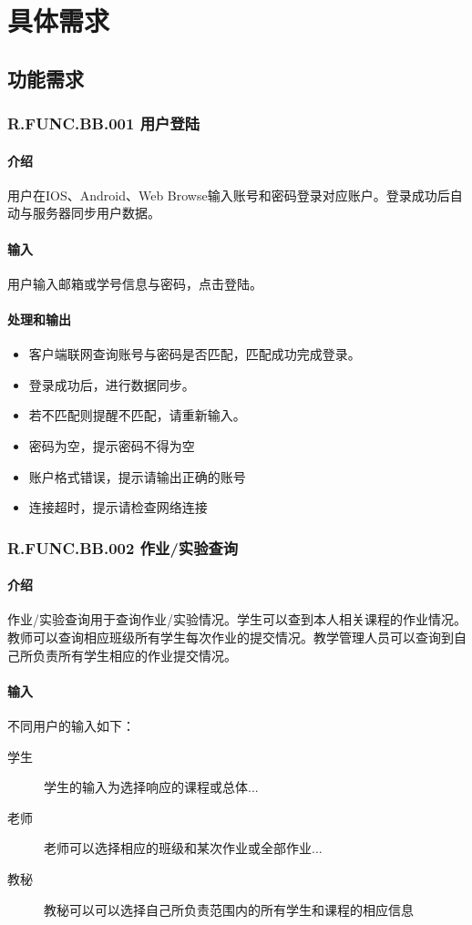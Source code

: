 \chapter{具体需求}
  \section{功能需求}
    \subsection{R.FUNC.BB.001 用户登陆}
    \subsubsection{介绍}
    用户在IOS、Android、Web Browse输入账号和密码登录对应账户。登录成功后自动与服务器同步用户数据。
    \subsubsection{输入}
    用户输入邮箱或学号信息与密码，点击登陆。
    \subsubsection{处理和输出}
    \begin{itemize}
      \item 客户端联网查询账号与密码是否匹配，匹配成功完成登录。
      \item 登录成功后，进行数据同步。
      \item 若不匹配则提醒不匹配，请重新输入。
      \item 密码为空，提示密码不得为空
      \item 账户格式错误，提示请输出正确的账号
      \item 连接超时，提示请检查网络连接
    \end{itemize}

\subsection{R.FUNC.BB.002 作业/实验查询}
      \subsubsection{介绍}
      作业/实验查询用于查询作业/实验情况。学生可以查到本人相关课程的作业情况。教师可以查询相应班级所有学生每次作业的提交情况。教学管理人员可以查询到自己所负责所有学生相应的作业提交情况。
      \subsubsection{输入}
      不同用户的输入如下：
      \begin{center}\begin{description}
        \item[学生] 学生的输入为选择响应的课程或总体...
        \item[老师] 老师可以选择相应的班级和某次作业或全部作业...
        \item[教秘] 教秘可以可以选择自己所负责范围内的所有学生和课程的相应信息
      \end{description}\end{center}
